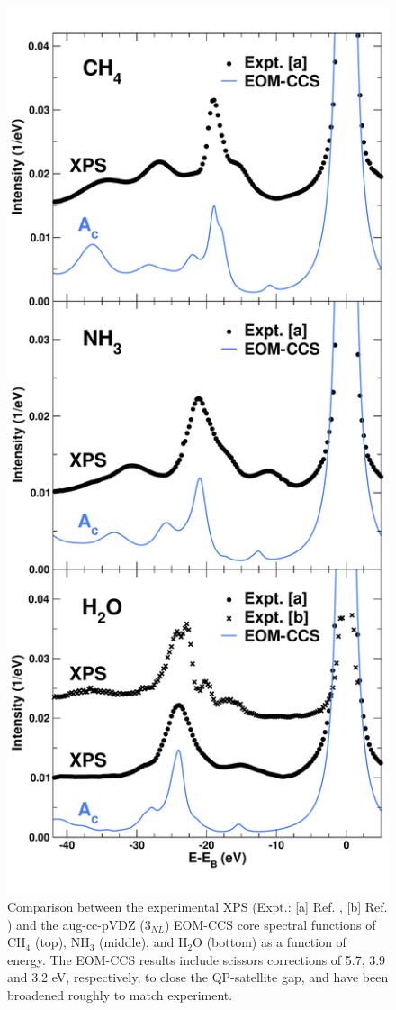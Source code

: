 \documentclass[aps,prb,twocolumn,groupaddress,floatfix]{revtex4}
\begin{document}
\begin{figure}[t]
\includegraphics[scale=0.28,
trim=0.0cm 1.9cm 0.0cm 1.0cm,clip]{Fig03.pdf}
\caption{\label{fig:A_c_expt}
Comparison between the experimental XPS (Expt.: [a] Ref. , [b] Ref. ) and the aug-cc-pVDZ (3$_{NL}$) EOM-CCS core spectral functions of CH$_4$ (top), NH$_3$ (middle), and H$_2$O (bottom) as a function of energy. The EOM-CCS results include scissors corrections of 5.7, 3.9 and 3.2 eV, respectively, to close the QP-satellite gap, and have been broadened roughly to match experiment.
}
\end{figure}
\end{document}
